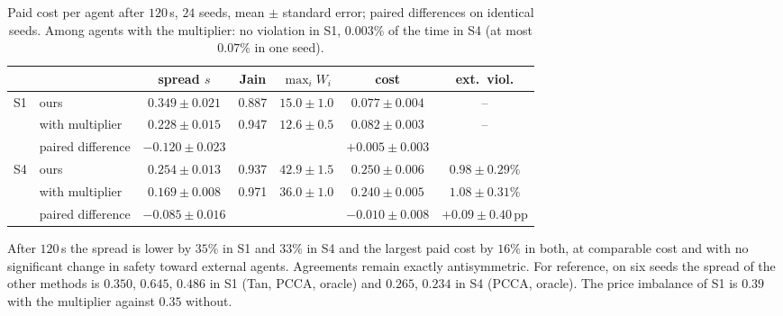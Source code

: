 \documentclass[11pt]{article}
\theoremstyle{definition}
\theoremstyle{remark}
\begin{document}
\begin{table}[h]
\centering\small
\begin{tabular}{llccccc}
\toprule
 & & spread $s$ & Jain & $\max_iW_i$ & cost & ext.\ viol.\\
\midrule
S1 & ours & $0.349\pm0.021$ & 0.887 & $15.0\pm1.0$ & $0.077\pm0.004$ & --\\
 & with multiplier & $0.228\pm0.015$ & 0.947 & $12.6\pm0.5$ & $0.082\pm0.003$ & --\\
 & paired difference & $-0.120\pm0.023$ & & & $+0.005\pm0.003$ & \\
\midrule
S4 & ours & $0.254\pm0.013$ & 0.937 & $42.9\pm1.5$ & $0.250\pm0.006$ & $0.98\pm0.29\%$\\
 & with multiplier & $0.169\pm0.008$ & 0.971 & $36.0\pm1.0$ & $0.240\pm0.005$ & $1.08\pm0.31\%$\\
 & paired difference & $-0.085\pm0.016$ & & & $-0.010\pm0.008$ & $+0.09\pm0.40$\,pp\\
\bottomrule
\end{tabular}
\caption{Paid cost per agent after $120$\,s, $24$ seeds, mean $\pm$ standard error; paired differences on identical seeds. Among agents with the multiplier: no violation in S1, $0.003\%$ of the time in S4 (at most $0.07\%$ in one seed).}
\label{tab:fairS}
\end{table}

After $120$\,s the spread is lower by $35\%$ in S1 and $33\%$ in S4 and the largest paid cost by $16\%$ in both, at comparable cost and with no significant change in safety toward external agents. Agreements remain exactly antisymmetric. For reference, on six seeds the spread of the other methods is $0.350$, $0.645$, $0.486$ in S1 (Tan, PCCA, oracle) and $0.265$, $0.234$ in S4 (PCCA, oracle). The price imbalance of S1 is $0.39$ with the multiplier against $0.35$ without.
\end{document}
